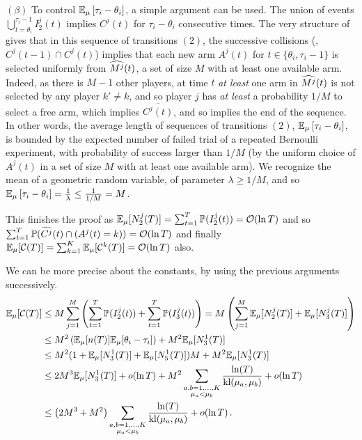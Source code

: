 \begin{smallproof}
  $(\beta)$ To control $\mathbb{E}_{\mu}\left[ \tau_i - \theta_i \right]$,
  a simple argument can be used.
  The union of events $\bigcup_{t=\theta_i}^{\tau_i-1} I_2^j(t)$
  implies $C^j(t)$ for $\tau_i - \theta_i$ consecutive times.
  The very structure of \RandTopM{} gives that in this sequence of transitions $(2)$,
  the successive collisions (\ie, $C^j(t-1) \cap C^j(t)$)
  implies that each new arm $A^j(t)$ for $t \in \{\theta_i, \tau_i-1\}$ is selected uniformly from
  $\widehat{M^j}(t)$,
  a set of size $M$ with at least one available arm.
  Indeed, as there is $M-1$ other players, at time $t$ \emph{at least} one arm in $\widehat{M^j}(t)$ is not selected by any player $k'\neq k$,
  and so player $j$ has \emph{at least} a probability $1/M$ to select
  a free arm, which implies $\overline{C^j(t)}$, and so implies the end of the sequence.
  In other words, the average length of sequences of transitions $(2)$,
  $\mathbb{E}_{\mu}\left[ \tau_i - \theta_i \right]$,
  is bounded by the expected number of failed trial of a repeated Bernoulli experiment, with probability of success larger than $1/M$ (by the uniform choice of $A^j(t)$ in a set of size $M$ with at least one available arm).
  We recognize the mean of a geometric random variable, of parameter $\lambda \geq 1/M$, and so $\mathbb{E}_{\mu}\left[ \tau_i - \theta_i \right] = \frac{1}{\lambda} \leq \frac{1}{1/M} = M$.

  This finishes the proof as $\mathbb{E}_{\mu}[N_2^j(T)] = \sum_{t=1}^T \mathbb{P}(I_2^j(t)) = \mathop{}\mathopen{}\mathcal{O}\mathopen{}\left(\ln T\right)$ and so
  $\sum_{t=1}^T \mathbb{P}(\widetilde{C^j}(t) \cap (A^j(t) = k)) = \mathop{}\mathopen{}\mathcal{O}\mathopen{}\left(\ln T\right)$
  and finally
  $\mathbb{E}_{\mu}[\mathcal{C}(T)] = \sum_{k=1}^K \mathbb{E}_{\mu}[\mathcal{C}^k(T)] = \mathop{}\mathopen{}\mathcal{O}\mathopen{}\left(\ln T\right)$ also.

  We can be more precise about the constants, by using the previous arguments successively.
  \begin{align*}
    \mathbb{E}_{\mu}[\mathcal{C}(T)]
    &\leq M \sum_{j=1}^M \left(\sum_{t=1}^T \mathbb{P}(I_2^j(t)) + \sum_{t=1}^T \mathbb{P}(I_3^j(t))\right)
    = M \left(\sum_{j=1}^M \mathbb{E}_{\mu}[N_2^j(T)] + \mathbb{E}_{\mu}[N_3^j(T)]\right) \\
    &\leq M^2 \left(\mathbb{E}_{\mu}[n(T)] \mathbb{E}_{\mu}[\theta_i - \tau_i] \right) + M^2 \mathbb{E}_{\mu}[N_3^1(T)] \\
    &\leq M^2 (1+\mathbb{E}_{\mu}[N_3^1(T)] + \mathbb{E}_{\mu}[N_5^1(T)]) M + M^2 \mathbb{E}_{\mu}[N_3^1(T)] \\
    &\leq 2 M^3 \mathbb{E}_{\mu}[N_3^1(T)] + \mathop{}\mathopen{}o\mathopen{}\left(\ln T\right) + M^2 \sum_{\substack{a,b=1,\dots,K\\\mu_a < \mu_b}} \frac{\ln(T)}{\mathrm{kl}(\mu_a,\mu_b)} + \mathop{}\mathopen{}o\mathopen{}\left(\ln T\right)  \\
    &\leq \left(2 M^3 + M^2\right) \sum_{\substack{a,b=1,\dots,K\\\mu_a < \mu_b}} \frac{\ln(T)}{\mathrm{kl}(\mu_a,\mu_b)} + \mathop{}\mathopen{}o\mathopen{}\left(\ln T\right).
  \end{align*}


\end{smallproof}
